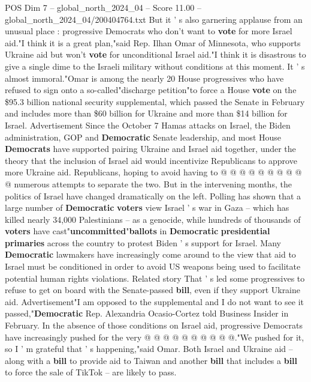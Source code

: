 \begin{textsample}{POS Dim 7 – global\_north\_2024\_04 – Score 11.00 – global\_north\_2024\_04/200404764.txt}  \label{ex:f7_pos_064}
But it ' s also garnering applause from an unusual place : progressive Democrats who don't want to \textbf{vote} for more Israel aid."I think it is a great plan,"said Rep.
Ilhan Omar of Minnesota, who supports Ukraine aid but won't \textbf{vote} for unconditional Israel aid."I think it is disastrous to give a single dime to the Israeli military without conditions at this moment.
It ' s almost immoral."Omar is among the nearly 20 House progressives who have refused to sign onto a so-called"discharge petition"to force a House \textbf{vote} on the \$95.3 billion national security supplemental, which passed the Senate in February and includes more than \$60 billion for Ukraine and more than \$14 billion for Israel.
Advertisement Since the October 7 Hamas attacks on Israel, the Biden administration, GOP and \textbf{Democratic} Senate leadership, and most House \textbf{Democrats} have supported pairing Ukraine and Israel aid together, under the theory that the inclusion of Israel aid would incentivize Republicans to approve more Ukraine aid.
Republicans, hoping to avoid having to @ @ @ @ @ @ @ @ @ @ numerous attempts to separate the two.
But in the intervening months, the politics of Israel have changed dramatically on the left.
Polling has shown that a large number of \textbf{Democratic} \textbf{voters} view Israel ' s war in Gaza -- which has killed nearly 34,000 Palestinians -- as a genocide, while hundreds of thousands of \textbf{voters} have cast"\textbf{uncommitted}"\textbf{ballots} in \textbf{Democratic} \textbf{presidential} \textbf{primaries} across the country to protest Biden ' s support for Israel.
Many \textbf{Democratic} lawmakers have increasingly come around to the view that aid to Israel must be conditioned in order to avoid US weapons being used to facilitate potential human rights violations.
Related story That ' s led some progressives to refuse to get on board with the Senate-passed \textbf{bill}, even if they support Ukraine aid.
Advertisement"I am opposed to the supplemental and I do not want to see it passed,"\textbf{Democratic} Rep.
Alexandria Ocasio-Cortez told Business Insider in February.
In the absence of those conditions on Israel aid, progressive Democrats have increasingly pushed for the very @ @ @ @ @ @ @ @ @ @."We pushed for it, so I ' m grateful that ' s happening,"said Omar.
Both Israel and Ukraine aid -- along with a \textbf{bill} to provide aid to Taiwan and another \textbf{bill} that includes a \textbf{bill} to force the sale of TikTok -- are likely to pass.

\end{textsample}
